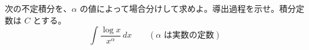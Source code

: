 
次の不定積分を、$\alpha$ の値によって場合分けして求めよ。導出過程を示せ。積分定数は $C$ とする。
\[
\int \frac{\log x}{x^{\alpha}} \, dx \qquad (\alpha \text{ は実数の定数})
\]
